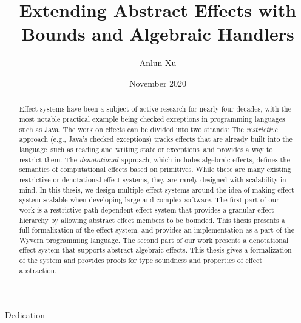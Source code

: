 \documentclass[12pt]{cmuthesis}
\begin{document}
 
\frontmatter

\pagestyle{empty}

\title{ %
{\bf Extending Abstract Effects with Bounds and Algebraic Handlers}}
\author{Anlun Xu}
\date{November 2020}
\trnumber{}


\support{}
\disclaimer{}



\maketitle

\begin{dedication}
Dedication
\end{dedication}

\pagestyle{plain} %


\begin{abstract}
Effect systems have been a subject of active research for nearly four decades, with the most notable practical example being checked exceptions in programming languages such as Java.  The work on effects can be divided into two strands: The \textit{restrictive} approach (e.g., Java's checked exceptions) tracks effects that are already built into the language--such as reading and writing state or exceptions--and provides a way to restrict them.  The \textit{denotational} approach, which includes algebraic effects, defines the semantics of computational effects based on primitives. While there are many existing restrictive or denotational effect systems, they are rarely designed with scalability in mind. In this thesis, we design multiple effect systems around the idea of making effect system scalable when developing large and complex software. The first part of our work is a restrictive path-dependent effect system that provides a granular effect hierarchy by allowing abstract effect members to be bounded. This thesis presents a full formalization of the effect system, and provides an implementation as a part of the Wyvern programming language. The second part of our work presents a denotational effect system that supports abstract algebraic effects. This thesis gives a formalization of the system and provides proofs for type soundness and properties of effect abstraction. 
\end{abstract}
\begin{acknowledgments}
\end{acknowledgments}
\end{document}
